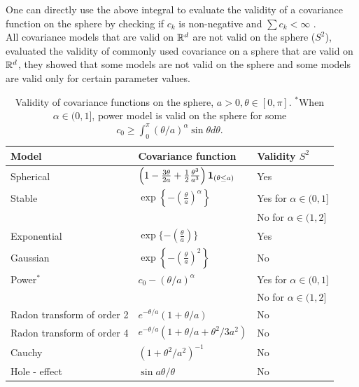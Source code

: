 	One can directly use the above integral to evaluate the validity of a covariance function on the sphere by checking if $c_k$ is non-negative and $\sum c_k < \infty$ .\\ 
	
	All covariance models that are valid on $\mathbb{R}^d$ are not valid on the sphere ($S^2$), \cite{HuangZhangRobeson2011} evaluated the validity of commonly used covariance on a sphere that are valid on $\mathbb{R}^d$, they showed that some models are not valid on the sphere and some models are valid only for certain parameter values.  
	 
	
	\begin{table}[H]
		\label{valid_cov_models}
		\centering
		\begin{tabular}[htb]{lll} \hline \hline
			Model & Covariance function & Validity  $S^2$           \\   \hline Spherical  &
			$\left(1-\frac{3\theta}{2a} + \frac{1}{2}
			\frac{\theta^3}{a^3}\right){\bf 1}_{(\theta \le a)}$ & Yes   \\
			[2ex]
			Stable     & $\exp\left\{-\left(\frac{\theta}{a}\right)^\alpha\right\}$ & Yes for $\alpha \in (0,1]$  \\
			      &                     & No for $\alpha \in (1,2]$ \\ [2ex] \hspace{0.2in} Exponential &
			$\exp \{-\left(\frac{\theta}{a}\right) \}$ & Yes \\ [2ex]
			\hspace{0.2in} Gaussian & $\exp\left\{-\left(\frac{\theta}{a} \right)^2
			\right\}$  & No \\ [2ex]
			Power$^*$   & $c_0 - (\theta/a)^\alpha$ & Yes for  $\alpha \in (0,1] $  \\
			& & No for $\alpha \in (1,2]$ \\ [2ex]
			Radon transform of order 2         & $e^{-\theta/a}(1+\theta/a)$ &
			No        \\ [2ex] Radon transform of order 4         &
			$e^{-\theta/a} (1+\theta/a+\theta^2/3a^2)$  & No  \\ [2ex] Cauchy &
			$(1+\theta^2/a^2)^{-1}$ &  No      \\ [2ex] Hole - effect & $\sin
			a\theta / \theta$ & No    \\ \hline \hline
		\end{tabular}
		\caption{Validity of covariance functions on the sphere, $a >
			0,\theta \in [0,\pi]$. $^*$When $\alpha \in (0,1]$, power model is
				valid on the sphere  for some $c_0 \ge \int_0^\pi
				(\theta/a)^{\alpha} \sin \theta d \theta$.} \label{tab:t1}
							
		\end{table}
			
